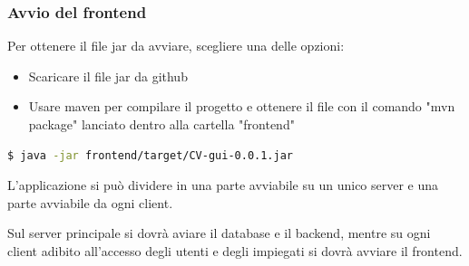 \documentclass{report}
\begin{document}
  \subsubsection{Avvio del frontend}

  Per ottenere il file jar da avviare, scegliere una delle opzioni:
  \begin{itemize}
    \item Scaricare il file jar da github
    \item Usare maven per compilare il progetto e ottenere il file con il comando "mvn package" lanciato dentro alla cartella "frontend"
  \end{itemize}
  \begin{lstlisting}[language=bash]
  $ java -jar frontend/target/CV-gui-0.0.1.jar
  \end{lstlisting}  


  L'applicazione si può dividere in una parte avviabile su un unico server e una parte avviabile da ogni client.

  Sul server principale si dovrà aviare il database e il backend, mentre su ogni client adibito all'accesso degli utenti e degli impiegati si dovrà avviare il frontend.
\end{document}
